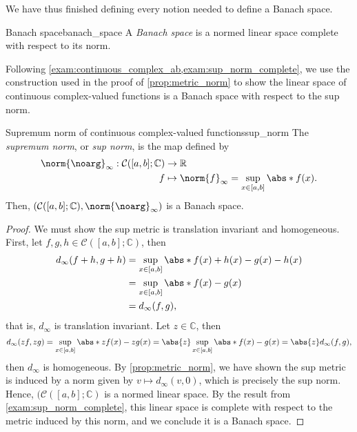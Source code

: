 We have thus finished defining every notion needed to define a Banach space.
\begin{definition}{Banach space}{banach_space}
    A \emph{Banach space} is a normed linear space complete with respect to its norm.
\end{definition}
Following \cref{exam:continuous_complex_ab,exam:sup_norm_complete}, we use the construction used in the proof of \cref{prop:metric_norm} to show the linear space of continuous complex-valued functions is a Banach space with respect to the sup norm.
\begin{example}{Supremum norm of continuous complex-valued functions}{sup_norm}
    The \emph{supremum norm}, or \emph{sup norm}, is the map defined by
    \begin{align*}
        \norm{\noarg}_{\infty} : \mathcal{C}([a,b];\mathbb{C}) &\to \mathbb{R}\\
                                                             f &\mapsto \norm{f}_\infty = \sup_{x \in [a,b]}\abs*{f(x)}.
    \end{align*}
    Then, \(\left(\mathcal{C}([a,b];\mathbb{C}), \norm{\noarg}_\infty\right)\) is a Banach space.
\end{example}
\begin{proof}
    We must show the sup metric is translation invariant and homogeneous. First, let \(f, g, h \in \mathcal{C}([a,b];\mathbb{C})\), then
    \begin{align*}
        d_\infty(f + h, g + h) &= \sup_{x \in [a,b]}\abs*{f(x) + h(x) - g(x) - h(x)} \\&= \sup_{x \in [a,b]} \abs*{f(x) - g(x)} \\&= d_\infty(f, g),
    \end{align*}
    that is, \(d_\infty\) is translation invariant. Let \(z \in \mathbb{C}\), then
    \begin{equation*}
        d_\infty(zf, zg) = \sup_{x\in[a,b]}\abs*{zf(x) - zg(x)} = \abs{z} \sup_{x\in[a,b]}\abs*{f(x) - g(x)} =  \abs{z} d_\infty(f,g),
    \end{equation*}
    then \(d_\infty\) is homogeneous. By \cref{prop:metric_norm}, we have shown the sup metric is induced by a norm given by \(v \mapsto d_\infty(v, 0)\), which is precisely the sup norm. Hence, \((\mathcal{C}([a,b];\mathbb{C})\) is a normed linear space. By the result from \cref{exam:sup_norm_complete}, this linear space is complete with respect to the metric induced by this norm, and we conclude it is a Banach space.
\end{proof}

